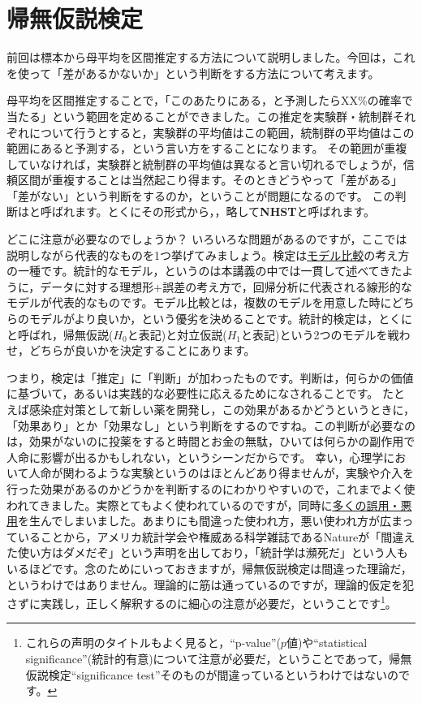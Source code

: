 \documentclass{ltjsbook}
\begin{document}
\chapter{帰無仮説検定}
\label{m18_NHST}
前回は標本から母平均を区間推定する方法について説明しました。今回は，これを使って「差があるかないか」という判断をする方法について考えます。

母平均を区間推定することで，「このあたりにある，と予測したらXX\%の確率で当たる」という範囲を定めることができました。この推定を実験群・統制群それぞれについて行うとすると，実験群の平均値はこの範囲，統制群の平均値はこの範囲にあると予測する，という言い方をすることになります。
その範囲が重複していなければ，実験群と統制群の平均値は異なると言い切れるでしょうが，信頼区間が重複することは当然起こり得ます。そのときどうやって「差がある」「差がない」という判断をするのか，ということが問題になるのです。
この判断はと呼ばれます。とくにその形式から，，略して\textbf{NHST}と呼ばれます。

\label{ModelComparison1}
どこに注意が必要なのでしょうか？ いろいろな問題があるのですが，ここでは説明しながら代表的なものを1つ挙げてみましょう。検定は\underline{モデル比較}の考え方の一種です。統計的なモデル，というのは本講義の中では一貫して述べてきたように，データに対する理想形+誤差の考え方で，回帰分析に代表される線形的なモデルが代表的なものです。モデル比較とは，複数のモデルを用意した時にどちらのモデルがより良いか，という優劣を決めることです。統計的検定は，とくにと呼ばれ，帰無仮説($H_0$と表記)と対立仮説($H_1$と表記)という2つのモデルを戦わせ，どちらが良いかを決定することにあります。

つまり，検定は「推定」に「判断」が加わったものです。判断は，何らかの価値に基づいて，あるいは実践的な必要性に応えるためになされることです。
たとえば感染症対策として新しい薬を開発し，この効果があるかどうというときに，「効果あり」とか「効果なし」という判断をするのですね。この判断が必要なのは，効果がないのに投薬をすると時間とお金の無駄，ひいては何らかの副作用で人命に影響が出るかもしれない，というシーンだからです。
幸い，心理学において人命が関わるような実験というのはほとんどあり得ませんが，実験や介入を行った効果があるのかどうかを判断するのにわかりやすいので，これまでよく使われてきました。実際とてもよく使われているのですが，同時に\underline{多くの誤用・悪用}を生んでしまいました。あまりにも間違った使われ方，悪い使われ方が広まっていることから，アメリカ統計学会や権威ある科学雑誌であるNatureが「間違えた使い方はダメだぞ」という声明を出しており\parencite{Wasserstein2016,amrhein2019scientists}，「統計学は瀕死だ」という人もいるほどです\parencite{Toyoda202003}。念のためにいっておきますが，帰無仮説検定は間違った理論だ，というわけではありません。理論的に筋は通っているのですが，理論的仮定を犯さずに実践し，正しく解釈するのに細心の注意が必要だ，ということです\footnote{これらの声明のタイトルもよく見ると，``p-value''($p$値)や``statistical significance''(統計的有意)について注意が必要だ，ということであって，帰無仮説検定``significance test''そのものが間違っているというわけではないのです。}。
\end{document}
